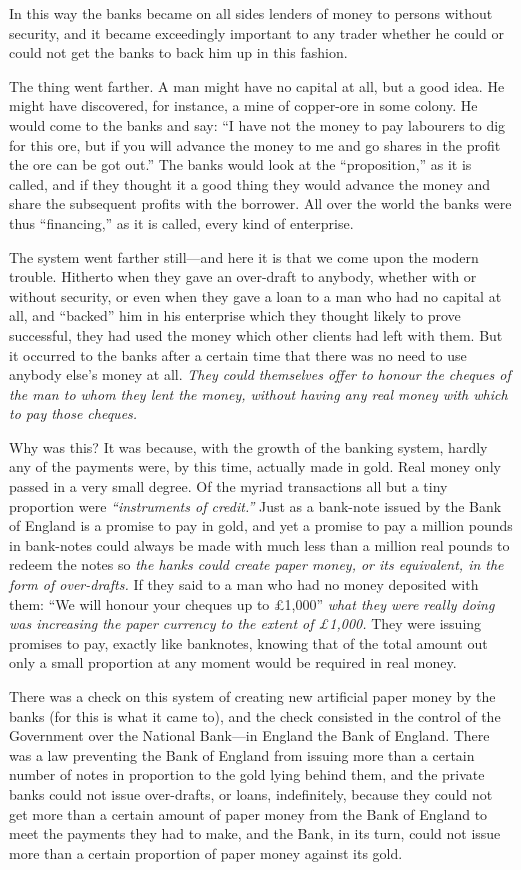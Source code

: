 \documentclass{book}
\begin{document}
In this way the banks became on all sides lenders of money to persons without security, and it became exceedingly important to any trader whether he could or could not get the banks to back him up in this fashion.

The thing went farther. A man might have no capital at all, but a good idea. He might have discovered, for instance, a mine of copper-ore in some colony. He would come to the banks and say: “I have not the money to pay labourers to dig for this ore, but if you will advance the money to me and go shares in the profit the ore can be got out.” The banks would look at the “proposition,” as it is called, and if they thought it a good thing they would advance the money and share the subsequent profits with the borrower. All over the world the banks were thus “financing,” as it is called, every kind of enterprise.

The system went farther still—and here it is that we come upon the modern trouble. Hitherto when they gave an over-draft to anybody, whether with or without security, or even when they gave a loan to a man who had no capital at all, and “backed” him in his enterprise which they thought likely to prove successful, they had used the money which other clients had left with them. But it occurred to the banks after a certain time that there was no need to use anybody else’s money at all. \emph{They could themselves offer to honour the cheques of the man to whom they lent the money, without having any real money with which to pay those cheques.}

Why was this? It was because, with the growth of the banking system, hardly any of the payments were, by this time, actually made in gold. Real money only passed in a very small degree. Of the myriad transactions all but a tiny proportion were \emph{“instruments of credit.”} Just as a bank-note issued by the Bank of England is a promise to pay in gold, and yet a promise to pay a million pounds in bank-notes could always be made with much less than a million real pounds to redeem the notes so \emph{the hanks could create paper money, or its equivalent, in the form of over-drafts.} If they said to a man who had no money deposited with them: “We will honour your cheques up to £1,000” \emph{what they were really doing was increasing the paper currency to the extent of £1,000.} They were issuing promises to pay, exactly like banknotes, knowing that of the total amount out only a small proportion at any moment would be required in real money.

There was a check on this system of creating new artificial paper money by the banks (for this is what it came to), and the check consisted in the control of the Government over the National Bank—in England the Bank of England. There was a law preventing the Bank of England from issuing more than a certain number of notes in proportion to the gold lying behind them, and the private banks could not issue over-drafts, or loans, indefinitely, because they could not get more than a certain amount of paper money from the Bank of England to meet the payments they had to make, and the Bank, in its turn, could not issue more than a certain proportion of paper money against its gold.
\end{document}
